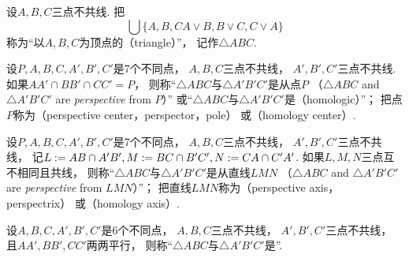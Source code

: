 
\begin{definition}
设\(A,B,C\)三点不共线.
把\begin{equation*}
	\bigcup\{
		A,B,C
		A \vee B,
		B \vee C,
		C \vee A
	\}
\end{equation*}
称为“以\(A,B,C\)为顶点的（triangle）”，
记作\(\triangle ABC\).
\end{definition}

\begin{definition}
设\(P,A,B,C,A',B',C'\)是7个不同点，
\(A,B,C\)三点不共线，
\(A',B',C'\)三点不共线.
如果\(AA' \cap BB' \cap CC' = P\)，
则称“\(\triangle ABC\)与\(\triangle A'B'C'\)是从点\(P\) （\(\triangle ABC\) and \(\triangle A'B'C'\) are \emph{perspective} from \(P\)）”
或“\(\triangle ABC\)与\(\triangle A'B'C'\)是（homologic）”；
把点\(P\)称为（perspective center，perspector，pole）
或（homology center）.
\end{definition}

\begin{definition}
设\(P,A,B,C,A',B',C'\)是7个不同点，
\(A,B,C\)三点不共线，
\(A',B',C'\)三点不共线，
记\(
	L := AB \cap A'B',
	M := BC \cap B'C',
	N := CA \cap C'A'
\).
如果\(L,M,N\)三点互不相同且共线，
则称“\(\triangle ABC\)与\(\triangle A'B'C'\)是从直线\(LMN\) （\(\triangle ABC\) and \(\triangle A'B'C'\) are \emph{perspective} from \(LMN\)）”；
把直线\(LMN\)称为（perspective axis，perspectrix）
或（homology axis）.
\end{definition}

\begin{definition}
设\(A,B,C,A',B',C'\)是6个不同点，
\(A,B,C\)三点不共线，
\(A',B',C'\)三点不共线，
且\(AA',BB',CC'\)两两平行，
则称“\(\triangle ABC\)与\(\triangle A'B'C'\)是”.
\end{definition}

